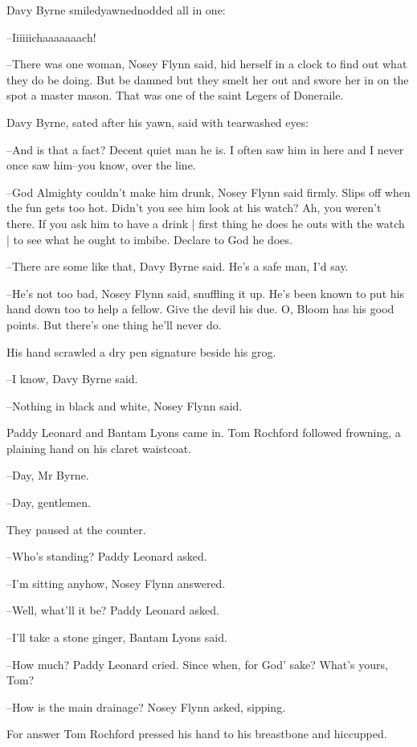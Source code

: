 Davy Byrne smiledyawnednodded all in one:

--Iiiiiichaaaaaaach!

--There was one woman,
Nosey Flynn said,
hid herself in a clock to find
out what they do be doing.
But be damned but they smelt her out
and swore her in on the spot a master mason.
That was one of the saint Legers of Doneraile.

Davy Byrne,
sated after his yawn,
said with tearwashed eyes:

--And is that a fact?
Decent quiet man he is.
I often saw him in here
and I never once saw him--you know,
over the line.

--God Almighty couldn't make him drunk,
Nosey Flynn said firmly.
Slips off when the fun gets too hot.
Didn't you see him look at his watch?
Ah, you weren't there.
If you ask him to have a drink |
first thing he does he outs with the watch |
to see what he ought to imbibe.
Declare to God he does.

--There are some like that,
Davy Byrne said.
He's a safe man, I'd say.

--He's not too bad,
Nosey Flynn said, snuffling it up.
He's been known to put his hand down too to help a fellow.
Give the devil his due.
O, Bloom has his good points.
But there's one thing he'll never do.

His hand scrawled a dry pen signature beside his grog.

--I know,
Davy Byrne said.

--Nothing in black and white,
Nosey Flynn said.

Paddy Leonard and Bantam Lyons came in.
Tom Rochford followed frowning,
a plaining hand on his claret waistcoat.

--Day, Mr Byrne.

--Day, gentlemen.

They paused at the counter.

--Who's standing?
Paddy Leonard asked.

--I'm sitting anyhow,
Nosey Flynn answered.

--Well, what'll it be?
Paddy Leonard asked.

--I'll take a stone ginger,
Bantam Lyons said.

--How much?
Paddy Leonard cried.
Since when, for God' sake?
What's yours, Tom?

--How is the main drainage?
Nosey Flynn asked, sipping.

For answer Tom Rochford pressed his hand to his breastbone and hiccupped.

